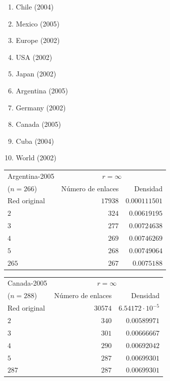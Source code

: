 \documentclass[10pt,a4paper,spanish]{article}
\numberwithin{equation}{section} %
\numberwithin{figure}{section} %
\numberwithin{table}{section} %
\begin{document}
\begin{enumerate}[\qquad\ ---]
    \item Chile (2004)
    \item Mexico (2005)
    \item Europe (2002)
    \item USA (2002)
    \item Japan (2002)
    \item Argentina (2005)
    \item Germany (2002)
    \item Canada (2005)
    \item Cuba (2004)
    \item World (2002)
\end{enumerate}


\begin{tabular}{lrr}
\hline
 Argentina-2005 & \multicolumn{2}{c}{$r = \infty$} \\
($n=266$)   &   Número de enlaces &    Densidad \\
\hline
 Red original                 &               $17938$ & $0.000111501$ \\
 $2$                            &                 $324$ & $0.00619195$  \\
 $3$                            &                 $277$ & $0.00724638$  \\
 $4$                            &                 $269$ & $0.00746269$  \\
 $5$                            &                 $268$ & $0.00749064$  \\
 $265$                          &                 $267$ & $0.0075188$   \\
\hline
\end{tabular}


\begin{tabular}{lrr}
\hline
 Canada-2005 & \multicolumn{2}{c}{$r = \infty$} \\
($n=288$)   &   Número de enlaces &    Densidad \\
\hline
 Red original              &               $30574$ & $6.54172 \cdot 10^{-5}$ \\
 $2$                         &                 $340$ & $0.00589971$  \\
 $3$                         &                 $301$ & $0.00666667$  \\
 $4$                         &                 $290$ & $0.00692042$  \\
 $5$                         &                 $287$ & $0.00699301$  \\
 $287$                       &                 $287$ & $0.00699301$  \\
\hline
\end{tabular}
\end{document}
